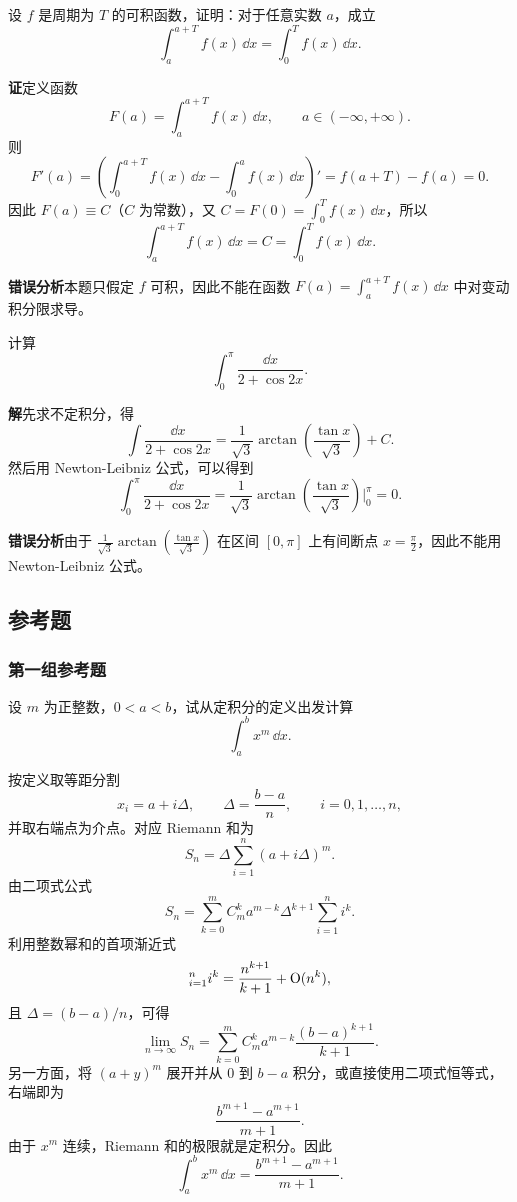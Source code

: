 \begin{xexample}[10.5.2]
设 $f$ 是周期为 $T$ 的可积函数，证明：对于任意实数 $a$，成立
\[
  \int_a^{a+T}f(x)\,\dd x=\int_0^T f(x)\,\dd x.
\]
\end{xexample}
\begin{xsolution}
\textbf{证}\quad 定义函数
\[
  F(a)=\int_a^{a+T}f(x)\,\dd x,\qquad a\in(-\infty,+\infty).
\]
则
\[
  F'(a)=\left(\int_0^{a+T}f(x)\,\dd x-\int_0^a f(x)\,\dd x\right)'
  =f(a+T)-f(a)=0.
\]
因此 $F(a)\equiv C$（$C$ 为常数），又 $C=F(0)=\int_0^T f(x)\,\dd x$，所以
\[
  \int_a^{a+T}f(x)\,\dd x=C=\int_0^T f(x)\,\dd x.
\]

\textbf{错误分析}\quad 本题只假定 $f$ 可积，因此不能在函数 $F(a)=\int_a^{a+T}f(x)\,\dd x$ 中对变动积分限求导。
\end{xsolution}

\begin{xexample}[10.5.3]
计算
\[
  \int_0^\pi\frac{\dd x}{2+\cos2x}.
\]
\end{xexample}
\begin{xsolution}
\textbf{解}\quad 先求不定积分，得
\[
  \int\frac{\dd x}{2+\cos2x}
  =\frac1{\sqrt3}\arctan\left(\frac{\tan x}{\sqrt3}\right)+C.
\]
然后用 Newton-Leibniz 公式，可以得到
\[
  \int_0^\pi\frac{\dd x}{2+\cos2x}
  =\frac1{\sqrt3}\arctan\left(\frac{\tan x}{\sqrt3}\right)\Big|_0^\pi=0.
\]

\textbf{错误分析}\quad 由于 $\frac1{\sqrt3}\arctan(\frac{\tan x}{\sqrt3})$ 在区间 $[0,\pi]$ 上有间断点 $x=\frac\pi2$，因此不能用 Newton-Leibniz 公式。
\end{xsolution}

\subsection{参考题}

\subsubsection*{第一组参考题}

\begin{xreferenceproblem}[1]
设 $m$ 为正整数，$0<a<b$，试从定积分的定义出发计算
\[
  \int_a^b x^m\,\dd x.
\]
\end{xreferenceproblem}
\begin{xsolution}
按定义取等距分割
\[
  x_i=a+i\Delta,
  \qquad
  \Delta=\frac{b-a}{n},
  \qquad i=0,1,\ldots,n,
\]
并取右端点为介点。对应 Riemann 和为
\[
  S_n=\Delta\sum_{i=1}^n(a+i\Delta)^m.
\]
由二项式公式
\[
  S_n=\sum_{k=0}^m C_m^k a^{m-k}\Delta^{k+1}
  \sum_{i=1}^n i^k.
\]
利用整数幂和的首项渐近式
\[
  \relax_{i=1}^n i^k=\frac{n^{k+1}}{k+1}+\mathrm{O}(n^k),
\]
且 $\Delta=(b-a)/n$，可得
\[
  \lim_{n\to\infty}S_n
  =\sum_{k=0}^m C_m^k a^{m-k}
  \frac{(b-a)^{k+1}}{k+1}.
\]
另一方面，将 $(a+y)^m$ 展开并从 $0$ 到 $b-a$ 积分，或直接使用二项式恒等式，右端即为
\[
  \frac{b^{m+1}-a^{m+1}}{m+1}.
\]
由于 $x^m$ 连续，Riemann 和的极限就是定积分。因此
\[
  \boxed{\int_a^b x^m\,\dd x=
  \frac{b^{m+1}-a^{m+1}}{m+1}}.
\]
\end{xsolution}


